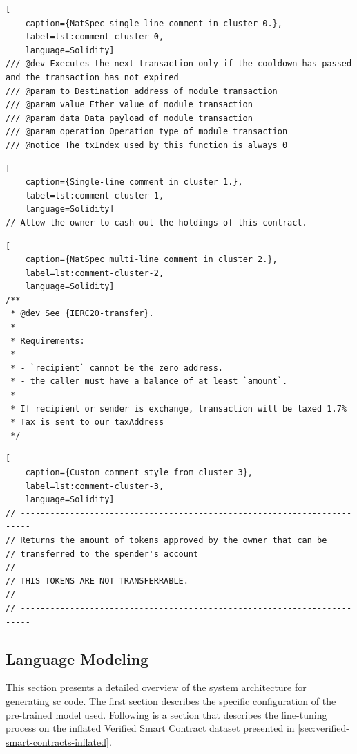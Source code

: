 \begin{lstlisting}[
    caption={NatSpec single-line comment in cluster 0.},
    label=lst:comment-cluster-0,
    language=Solidity]
/// @dev Executes the next transaction only if the cooldown has passed and the transaction has not expired
/// @param to Destination address of module transaction
/// @param value Ether value of module transaction
/// @param data Data payload of module transaction
/// @param operation Operation type of module transaction
/// @notice The txIndex used by this function is always 0
\end{lstlisting}

\begin{lstlisting}[
    caption={Single-line comment in cluster 1.},
    label=lst:comment-cluster-1,
    language=Solidity]
// Allow the owner to cash out the holdings of this contract.
\end{lstlisting}

\begin{lstlisting}[
    caption={NatSpec multi-line comment in cluster 2.},
    label=lst:comment-cluster-2,
    language=Solidity]
/**
 * @dev See {IERC20-transfer}.
 *
 * Requirements:
 *
 * - `recipient` cannot be the zero address.
 * - the caller must have a balance of at least `amount`.
 * 
 * If recipient or sender is exchange, transaction will be taxed 1.7%
 * Tax is sent to our taxAddress
 */
\end{lstlisting}

\begin{lstlisting}[
    caption={Custom comment style from cluster 3},
    label=lst:comment-cluster-3,
    language=Solidity]
// ------------------------------------------------------------------------
// Returns the amount of tokens approved by the owner that can be
// transferred to the spender's account
//
// THIS TOKENS ARE NOT TRANSFERRABLE.
//
// ------------------------------------------------------------------------
\end{lstlisting}

\clearpage %

\subsection{Language Modeling}
\label{sec:rq1-language-modeling}
This section presents a detailed overview of the system architecture for generating \acrlong{sc} code. The first section describes the specific configuration of the pre-trained model used. Following is a section that describes the fine-tuning process on the inflated Verified Smart Contract dataset presented in \cref{sec:verified-smart-contracts-inflated}. 

